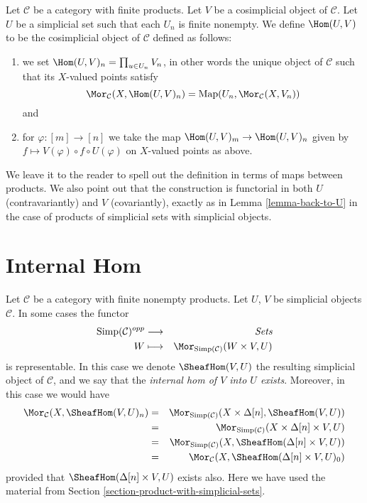 \begin{definition}
\label{definition-hom-deltak-cosimplicial}
Let $\mathcal{C}$ be a category with finite products.
Let $V$ be a cosimplicial object of $\mathcal{C}$.
Let $U$ be a simplicial set such that each
$U_n$ is finite nonempty.
We define {\it $\Hom(U, V)$} to be
the cosimplicial object of $\mathcal{C}$ defined
as follows:
\begin{enumerate}
\item we set $\Hom(U, V)_n = \prod_{u \in U_n} V_n$,
in other words the unique object of $\mathcal{C}$ such
that its $X$-valued points satisfy
$$
\Mor_\mathcal{C}(X, \Hom(U, V)_n)
=
\text{Map}(U_n, \Mor_\mathcal{C}(X, V_n))
$$
and
\item for $\varphi : [m] \to [n]$ we take the map
$\Hom(U, V)_m \to \Hom(U, V)_n$
given by $f \mapsto V(\varphi) \circ f \circ U(\varphi)$
on $X$-valued points as above.
\end{enumerate}
\end{definition}

\noindent
We leave it to the reader to spell out the
definition in terms of maps between products.
We also point out that the construction is functorial
in both $U$ (contravariantly) and $V$ (covariantly), exactly as in
Lemma \ref{lemma-back-to-U} in the case of
products of simplicial sets with simplicial objects.









\section{Internal Hom}
\label{section-internal-hom}

\noindent
Let $\mathcal{C}$ be a category with finite nonempty
products. Let $U$, $V$ be simplicial objects $\mathcal{C}$.
In some cases the functor
\begin{eqnarray*}
\text{Simp}(\mathcal{C})^{opp} & \longrightarrow & \textit{Sets} \\
W & \longmapsto & \Mor_{\text{Simp}(\mathcal{C})}(W \times V, U)
\end{eqnarray*}
is representable. In this case we denote $\SheafHom(V, U)$
the resulting simplicial object of $\mathcal{C}$, and we say
that the {\it internal hom of $V$ into $U$ exists}. Moreover,
in this case we would have
\begin{eqnarray*}
\Mor_\mathcal{C}(X, \SheafHom(V, U)_n)
& = &
\Mor_{\text{Simp}(\mathcal{C})}(X \times \Delta[n], \SheafHom(V, U))
\\
& = &
\Mor_{\text{Simp}(\mathcal{C})}(X \times \Delta[n]\times V, U) \\
& = &
\Mor_{\text{Simp}(\mathcal{C})}(X, \SheafHom(\Delta[n] \times V, U))
\\
& = &
\Mor_\mathcal{C}(X, \SheafHom(\Delta[n] \times V, U)_0)
\end{eqnarray*}
provided that $\SheafHom(\Delta[n] \times V, U)$
exists also. Here we have used the material from Section
\ref{section-product-with-simplicial-sets}.

